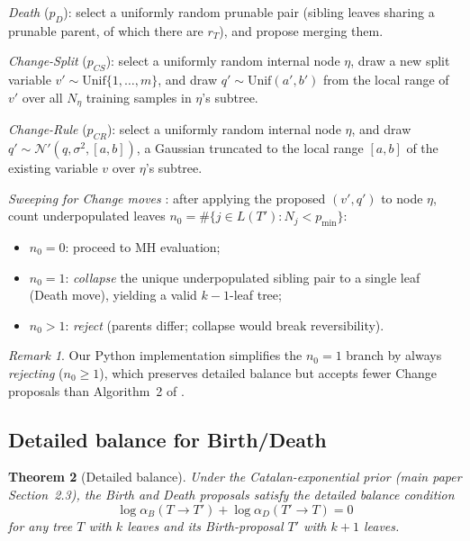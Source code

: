 \documentclass[ba,preprint]{imsart}
\theoremstyle{plain}
\newtheorem{theorem}{Theorem}
\theoremstyle{remark}
\newtheorem{remark}[theorem]{Remark}
\begin{document}
\emph{Death} ($p_D$): select a uniformly random prunable pair
(sibling leaves sharing a prunable parent, of which there are $r_T$),
and propose merging them.

\emph{Change-Split} ($p_{CS}$): select a uniformly random internal node $\eta$,
draw a new split variable $v' \sim \mathrm{Unif}\{1,\ldots,m\}$, and draw
$q' \sim \mathrm{Unif}(a',b')$ from the local range of $v'$ over all
$N_\eta$ training samples in $\eta$'s subtree.

\emph{Change-Rule} ($p_{CR}$): select a uniformly random internal node $\eta$,
and draw $q' \sim \mathcal{N}'(q,\sigma^2,[a,b])$, a Gaussian truncated to
the local range $[a,b]$ of the existing variable $v$ over $\eta$'s subtree.

\emph{Sweeping for Change moves} \citep{schetinin2025}: after applying the
proposed $(v',q')$ to node $\eta$, count underpopulated leaves
$n_0 = \#\{j \in L(T') : N_j < p_{\min}\}$:
\begin{itemize}
  \item $n_0 = 0$: proceed to MH evaluation;
  \item $n_0 = 1$: \emph{collapse} the unique underpopulated sibling pair to
        a single leaf (Death move), yielding a valid $k{-}1$-leaf tree;
  \item $n_0 > 1$: \emph{reject} (parents differ; collapse would break
        reversibility).
\end{itemize}
\begin{remark}
Our Python implementation simplifies the $n_0=1$ branch by always
\emph{rejecting} ($n_0 \geq 1$), which preserves detailed balance but
accepts fewer Change proposals than Algorithm~2 of \citet{schetinin2025}.
\end{remark}

\subsection{Detailed balance for Birth/Death}

\begin{theorem}[Detailed balance]
\label{thm:db}
  Under the Catalan-exponential prior (main paper Section~2.3),
  the Birth and Death proposals satisfy the detailed balance condition
  \begin{equation}
    \log\alpha_B(T \to T') + \log\alpha_D(T' \to T) = 0
    \label{eq:db_identity}
  \end{equation}
  for any tree $T$ with $k$ leaves and its Birth-proposal $T'$ with $k+1$ leaves.
\end{theorem}
\end{document}

